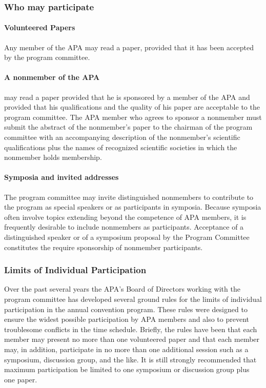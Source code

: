 {{\subsubsection{Who may participate}
\label{whomayparticipate}

\paragraph{Volunteered Papers}
\label{volunteeredpapers}

Any member of the APA may read a paper, provided that it has been accepted by the program committee.

\paragraph{A nonmember of the APA}
\label{anonmemberoftheapa}

may read a paper provided that he is sponsored by a member of the APA and provided that his qualifications and the quality of his paper are acceptable to the program committee. The APA member who agrees to sponsor a nonmember must submit the abstract of the nonmember's paper to the chairman of the program committee with an accompanying description of the nonmember's scientific qualifications plus the names of recognized scientific societies in which the nonmember holds membership.

\paragraph{Symposia and invited addresses}
\label{symposiaandinvitedaddresses}

The program committee may invite distinguished nonmembers to contribute to the program as special speakers or as participants in symposia. Because symposia often involve topics extending beyond the competence of APA members, it is frequently desirable to include nonmembers as participants. Acceptance of a distinguished speaker or of a symposium proposal by the Program Committee constitutes the require sponsorship of nonmember participants.

\subsubsection{Limits of Individual Participation}
\label{limitsofindividualparticipation}

Over the past several years the APA's Board of Directors working with the program committee has developed several ground rules for the limits of individual participation in the annual convention program. These rules were designed to ensure the widest possible participation by APA members and also to prevent troublesome conflicts in the time schedule. Briefly, the rules have been that each member may present no more than one volunteered paper and that each member may, in addition, participate in no more than one additional session such as a symposium, discussion group, and the like. It is still strongly recommended that maximum participation be limited to one symposium or discussion group plus one paper.

}}
